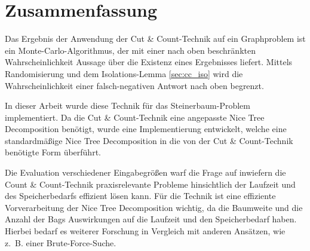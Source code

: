 \section{Zusammenfassung}
\label{c:summary}
Das Ergebnis der Anwendung der Cut \& Count-Technik auf ein Graphproblem ist ein Monte-Carlo-Algorithmus, der mit einer nach oben beschränkten Wahrscheinlichkeit Aussage über die Existenz eines Ergebnisses liefert. Mittels Randomisierung und dem Isolations-Lemma \ref{sec:cc_iso} wird die Wahrscheinlichkeit einer falsch-negativen Antwort nach oben begrenzt. 

In dieser Arbeit wurde diese Technik für das Steinerbaum-Problem implementiert. Da die Cut \& Count-Technik eine angepasste Nice Tree Decomposition benötigt, wurde eine Implementierung entwickelt, welche eine standardmäßige Nice Tree Decomposition in die von der Cut \& Count-Technik benötigte Form überführt.

Die Evaluation verschiedener Eingabegrößen warf die Frage auf inwiefern die Count \& Count-Technik praxisrelevante Probleme hinsichtlich der Laufzeit und des Speicherbedarfs effizient lösen kann. 
Für die Technik ist eine effiziente Vorverarbeitung der Nice Tree Decomposition wichtig, da die Baumweite und die Anzahl der Bags Auswirkungen auf die Laufzeit und den Speicherbedarf haben.
Hierbei bedarf es weiterer Forschung in Vergleich mit anderen Ansätzen, wie z.~B. einer Brute-Force-Suche.